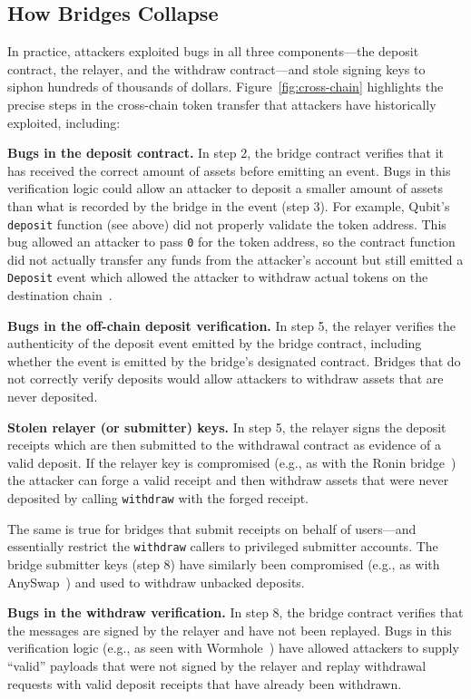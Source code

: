 \subsection{How Bridges Collapse}
In practice, attackers exploited bugs in all three components---the deposit
contract, the relayer, and the withdraw contract---and stole signing keys
to siphon hundreds of thousands of dollars.
%
Figure~\ref{fig:cross-chain} highlights the precise steps in the cross-chain
token transfer that attackers have historically exploited, including:
\begin{CompactItemize}
\item \textbf{Bugs in the deposit contract.} In step 2, the bridge contract
verifies that it has received the correct amount of assets before emitting an
event. Bugs in this verification logic could allow an attacker to deposit a
smaller amount of assets than what is recorded by the bridge in the event (step
3). For example, Qubit's \texttt{deposit} function  (see above) did not properly validate the token address. This bug allowed an attacker to pass \texttt{0} for the token address, so the contract function did not actually transfer any funds from the attacker's account but still emitted a \texttt{Deposit} event which allowed the attacker to withdraw actual tokens on the destination chain~\cite{qubit:rekt}.

\item \textbf{Bugs in the off-chain deposit verification.} In step 5, the
relayer verifies the authenticity of the deposit event emitted by the
bridge contract, including whether the event is emitted by the bridge's
designated contract.  Bridges that do not correctly verify
deposits would allow attackers to withdraw assets that are never deposited.

\item \textbf{Stolen relayer (or submitter) keys.} In step 5, the relayer signs the deposit receipts which are then submitted to the withdrawal
contract as evidence of a valid deposit. If the relayer key is compromised
(e.g., as with the Ronin bridge~\cite{roninattack}) the attacker can forge a
valid receipt and then withdraw assets that were never deposited by calling
\texttt{withdraw} with the forged receipt.

The same is true for bridges that submit receipts on behalf of users---and
essentially restrict the \texttt{withdraw} callers to privileged submitter
accounts. The bridge submitter keys (step 8) have similarly been compromised
(e.g., as with AnySwap~\cite{anyswapattack}) and used to withdraw
unbacked deposits.

\item \textbf{Bugs in the withdraw verification.} In step 8, the bridge contract
verifies that the messages are signed by the relayer and have not
been replayed. Bugs in this verification logic (e.g., as seen with
Wormhole~\cite{wormholeattack}) have allowed attackers to supply ``valid''
payloads that were not signed by the relayer and replay withdrawal
requests with valid deposit receipts that have already been withdrawn.
\end{CompactItemize}



